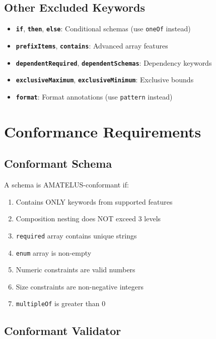 \subsection{Other Excluded Keywords}

\begin{itemize}
  \item \textbf{\texttt{if}}, \textbf{\texttt{then}}, \textbf{\texttt{else}}: Conditional schemas (use \texttt{oneOf} instead)
  \item \textbf{\texttt{prefixItems}}, \textbf{\texttt{contains}}: Advanced array features
  \item \textbf{\texttt{dependentRequired}}, \textbf{\texttt{dependentSchemas}}: Dependency keywords
  \item \textbf{\texttt{exclusiveMaximum}}, \textbf{\texttt{exclusiveMinimum}}: Exclusive bounds
  \item \textbf{\texttt{format}}: Format annotations (use \texttt{pattern} instead)
\end{itemize}

\section{Conformance Requirements}

\subsection{Conformant Schema}

A schema is AMATELUS-conformant if:

\begin{enumerate}
  \item Contains ONLY keywords from supported features
  \item Composition nesting does NOT exceed 3 levels
  \item \texttt{required} array contains unique strings
  \item \texttt{enum} array is non-empty
  \item Numeric constraints are valid numbers
  \item Size constraints are non-negative integers
  \item \texttt{multipleOf} is greater than 0
\end{enumerate}

\subsection{Conformant Validator}

